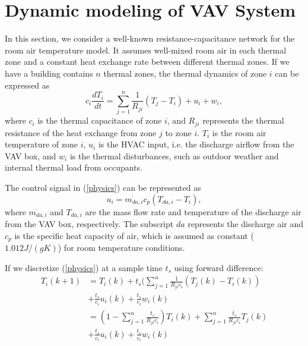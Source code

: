 \documentclass[conference]{IEEEtran}
\begin{document}
\section{Dynamic modeling of VAV System} \label{thermalModeling}
In this section, we consider a well-known resistance-capacitance network \cite{gouda2000low}\cite{bueno2012resistance} for the room air temperature model. It assumes well-mixed room air in each thermal zone and a constant heat exchange rate between different thermal zones. If we have a building contains $n$ thermal zones, the thermal dynamics of zone $i$ can be expressed as
\begin{equation}
c_{i}\frac{dT_{i}}{dt}=\sum_{j=1}^{n}\frac{1}{R_{ji}}(T_{j}-T_{i})+u_{i}+w_{i}, \label{physics}
\end{equation}
where $c_{i}$ is the thermal capacitance of zone $i$, and $R_{ji}$ represents the thermal resistance of the heat exchange from zone $j$ to zone $i$. $T_{i}$ is the room air temperature of zone $i$, $u_{i}$ is the HVAC input, i.e. the discharge airflow from the VAV box, and $w_{i}$ is the thermal disturbances, such as outdoor weather and internal thermal load from occupants.

The control signal in (\ref{physics}) can be represented as
\begin{equation}
u_{i}=\dot{m_{da,i}}c_{p}(T_{da,i}-T_{i}), \label{control}
\end{equation}
where $\dot{m_{da,i}}$ and $T_{da,i}$ are the mass flow rate and temperature of the discharge air from the VAV box, respectively. The subscript $da$ represents the discharge air and $c_{p}$ is the specific heat capacity of air, which is assumed as constant ($1.012 J/(gK)$) for room temperature conditions.

If we discretize (\ref{physics}) at a sample time $t_{s}$ using forward difference:
\begin{align}
\nonumber 
T_{i}(k+1) &= T_{i}(k) + t_{s}(\sum_{j=1}^{n}\frac{1}{R_{ji}c_{i}}(T_{j}(k)-T_{i}(k))\\ \nonumber 
&+\frac{t_{s}}{c_{i}}u_{i}(k)+\frac{t_{s}}{c_{i}}w_{i}(k)\\ \nonumber
&= (1-\sum_{j=1}^{n}\frac{t_{s}}{R_{ji}c_{i}})T_{i}(k)+
\sum_{j=1}^{n}\frac{t_{s}}{R_{ji}c_{i}}T_{j}(k)\\ \label{digital}
&+\frac{t_{s}}{c_{i}}u_{i}(k)+\frac{t_{s}}{c_{i}}w_{i}(k)
\end{align}
\end{document}
